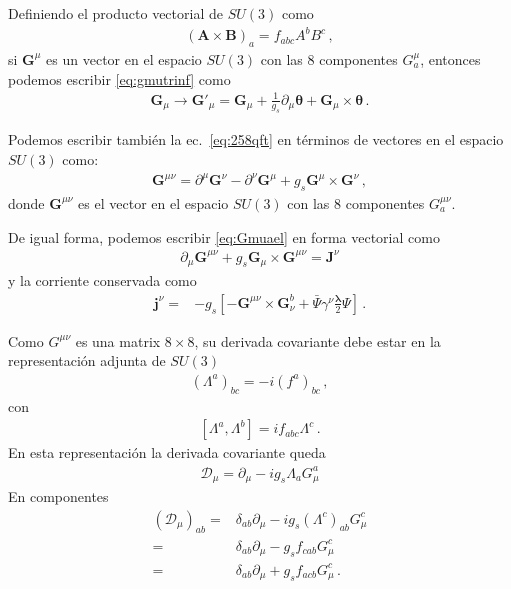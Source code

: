 Definiendo el producto vectorial de $SU(3)$ como
\begin{align}
  \left(\mathbf{A}\times \mathbf{B}\right)_a=f_{abc}A^b B^c\,,
\end{align}
si $\mathbf{G}^\mu$ es un vector en el espacio $SU(3)$ con las 8 componentes $G^\mu_a$, entonces podemos escribir \eqref{eq:gmutrinf} como
\begin{align}
  \mathbf{G}_\mu\to\mathbf{G}'_\mu=\mathbf{G}_\mu+\frac{1}{g_s}\partial_\mu\boldsymbol{\theta}+\mathbf{G}_\mu\times \boldsymbol{\theta}\,.
\end{align}

Podemos escribir también la ec.~\eqref{eq:258qft} en términos de vectores en el espacio $SU(3)$ como:
\begin{align}
  \mathbf{G}^{\mu\nu}=\partial^\mu \mathbf{G}^\nu-\partial^\nu \mathbf{G}^\mu+g_s \mathbf{G}^\mu\times  \mathbf{G}^\nu\,,
\end{align}
donde $\mathbf{G}^{\mu\nu}$ es el vector en el espacio $SU(3)$ con las 8 componentes $G^{\mu\nu}_a$.



De igual forma, podemos escribir \eqref{eq:Gmuael} en forma vectorial como
\begin{align}
  \partial_\mu\mathbf{G}^{\mu\nu}+g_s \mathbf{G}_\mu\times \mathbf{G}^{\mu\nu}=\mathbf{J}^\nu
\end{align}
y la corriente conservada como
\begin{align}
 \mathbf{j}^\nu =&-g_s\left[-\mathbf{G}^{\mu\nu}\times \mathbf{G}_\nu^b+\bar{\Psi}\gamma^\nu\frac{\boldsymbol{\lambda}}{2}\Psi  \right]\,.
\end{align}

Como ${G}^{\mu\nu}$ es una matrix $8\times 8$, su derivada covariante debe estar en la representación adjunta de $SU(3)$
\begin{align}
  \left(\Lambda^a\right)_{bc}=-i\left(f^a\right)_{bc}\,,
\end{align}
con
\begin{align}
  \left[\Lambda^a,\Lambda^b\right]=i f_{abc}\Lambda^c\,.
\end{align}
En esta representación la derivada covariante queda
\begin{align}
  \mathcal{D}_\mu=\partial_\mu-i g_s\Lambda_aG_\mu^a
\end{align}
En componentes
\begin{align}
  \left(\mathcal{D}_\mu\right)_{ab}=&\delta_{ab}\partial_\mu-i g_s (\Lambda^c)_{ab}G_\mu^c\nonumber\\
  =&\delta_{ab}\partial_\mu-g_s f_{cab}G_\mu^c\nonumber\\
  =&\delta_{ab}\partial_\mu+g_s f_{acb}G_\mu^c\,.
\end{align}

